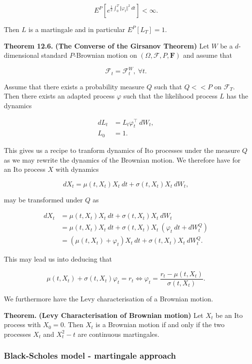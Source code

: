 \documentclass[
]{article}
\begin{document}
\[
E^P\left[e^{\frac{1}{2}\int_0^T\Vert \varphi_t\Vert^2\ dt}\right]<\infty.
\]

Then \(L\) is a martingale and in particular \(E^P[L_T]=1\).

\textbf{Theorem 12.6.} \textbf{(The Converse of the Girsanov Theorem)}
Let \(W\) be a \(d\)-dimensional standard \(P\)-Brownian motion on
\((\Omega,\mathcal{F},P,\mathbf{F})\) and assume that

\[
\mathcal{F}_t=\mathcal{F}^W_t,\ \forall t.
\]

Assume that there exists a probability measure \(Q\) such that \(Q<<P\)
on \(\mathcal{F}_T\). Then there exists an adapted process \(\varphi\)
such that the likelihood process \(L\) has the dynamics

\begin{align*}
dL_t&=L_t\varphi^\top_t\ dW_t,\\
L_0&=1.
\end{align*}

This gives us a recipe to tranform dynamics of Ito processes under the
measure \(Q\) as we may rewrite the dynamics of the Brownian motion. We
therefore have for an Ito process \(X\) with dynamics

\[
dX_t=\mu(t,X_t)X_t\ dt+\sigma(t,X_t) X_t\ dW_t,
\]

may be transformed under \(Q\) as

\begin{align*}
dX_t&=\mu(t,X_t)X_t\ dt+\sigma(t,X_t) X_t\ dW_t\\
&=\mu(t,X_t)X_t\ dt+\sigma(t,X_t) X_t\ (\varphi_t\ dt+dW_t^Q)\\
&=\left(\mu(t,X_t) + \varphi_t\right) X_t\ dt + \sigma(t,X_t)X_t\ dW_t^Q.
\end{align*}

This may lead us into deducing that

\[
\mu(t,X_t)+\sigma(t,X_t)\varphi_t=r_t\iff\varphi_t=\frac{r_t-\mu(t,X_t)}{\sigma(t,X_t)}.
\]

We furthermore have the Levy characterisation of a Brownian motion.

\textbf{Theorem.} \textbf{(Levy Characterisation of Brownian motion)}
Let \(X_t\) be an Ito process with \(X_0=0\). Then \(X_t\) is a Brownian
motion if and only if the two processes \(X_t\) and \(X_t^2-t\) are
continuous martingales.

\hypertarget{black-scholes-model---martingale-approach}{%
\subsubsection{Black-Scholes model - martingale
approach}\label{black-scholes-model---martingale-approach}}
\end{document}
